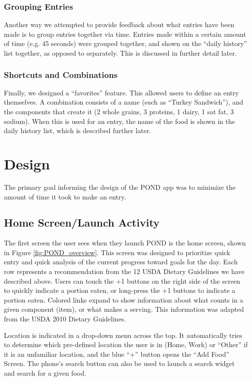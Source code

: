 \subsubsection{Grouping Entries}
Another way we attempted to provide feedback about what entries have been made is to group entries together via time. Entries made within a certain amount of time (e.g. 45 seconds) were grouped together, and shown on the ``daily history'' list together, as opposed to separately. This is discussed in further detail later. 

\subsubsection{Shortcuts and Combinations}

Finally, we designed a ``favorites'' feature. This allowed users to define an entry themselves. A combination consists of a name (such as ``Turkey Sandwich''), and the components that create it (2 whole grains, 3 proteins, 1 dairy, 1 sat fat, 3 sodium). When this is used for an entry, the name of the food is shown in the daily history list, which is described further later. 

\section{Design}
The primary goal informing the design of the POND app was to minimize the amount of time it took to make an entry. 

\subsection{Home Screen/Launch Activity}
The first screen the user sees when they launch POND is the home screen, shown in Figure \ref{fig:POND_overview}. This screen was designed to prioritize quick entry and quick analysis of the current progress toward goals for the day. Each row represents a recommendation from the 12 USDA Dietary Guidelines we have described above. Users can touch the +1 buttons on the right side of the screen to quickly indicate a portion eaten, or long-press the +1 buttons to indicate a \textonehalf portion eaten. Colored links expand to show information about what counts in a given component (item), or what makes a serving. This information was adapted from the USDA 2010 Dietary Guidelines. 

Location is indicated in a drop-down menu across the top. It automatically tries to determine which pre-defined location the user is in (Home, Work) or ``Other'' if it is an unfamiliar location, and the blue ``+'' button opens the ``Add Food'' Screen. The phone's search button can also be used to launch a search widget and search for a given food. 

